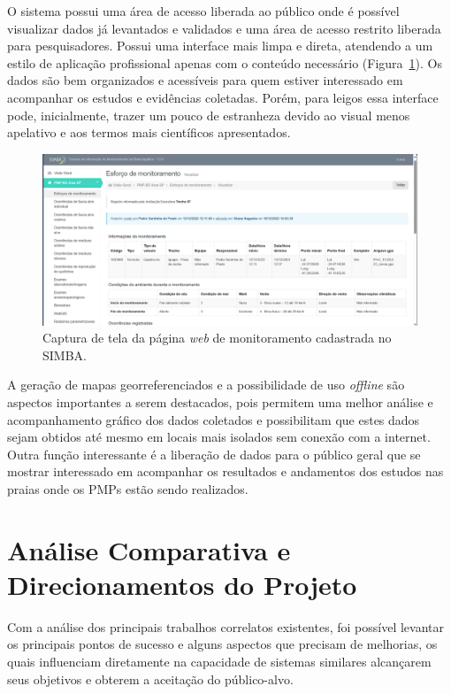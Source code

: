 O sistema possui uma área de acesso liberada ao público onde é possível visualizar dados já levantados e validados e uma área de acesso restrito liberada para pesquisadores. Possui uma interface mais limpa e direta, atendendo a um estilo de aplicação profissional apenas com o conteúdo necessário (Figura~\ref{fig:simbaPaginaCadastro}). Os dados são bem organizados e acessíveis para quem estiver interessado em acompanhar os estudos e evidências coletadas. Porém, para leigos essa interface pode, inicialmente, trazer um pouco de estranheza devido ao visual menos apelativo e aos termos mais científicos apresentados.

\begin{figure}[htb]
  \centering
  \includegraphics[width=1\textwidth]{imagens/simbaMonitoramento.png}
  \caption{Captura de tela da página \textit{web} de monitoramento cadastrada no SIMBA.}
  \label{fig:simbaPaginaCadastro}
\end{figure}

A geração de mapas georreferenciados e a possibilidade de uso \textit{offline} são aspectos importantes a serem destacados, pois permitem uma melhor análise e acompanhamento gráfico dos dados coletados e possibilitam que estes dados sejam obtidos até mesmo em locais mais isolados sem conexão com a internet. Outra função interessante é a liberação de dados para o público geral que se mostrar interessado em acompanhar os resultados e andamentos dos estudos nas praias onde os PMPs estão sendo realizados.

\section{Análise Comparativa e Direcionamentos do Projeto}

Com a análise dos principais trabalhos correlatos existentes, foi possível levantar os principais pontos de sucesso e alguns aspectos que precisam de melhorias, os quais influenciam diretamente na capacidade de sistemas similares alcançarem seus objetivos e obterem a aceitação do público-alvo.

